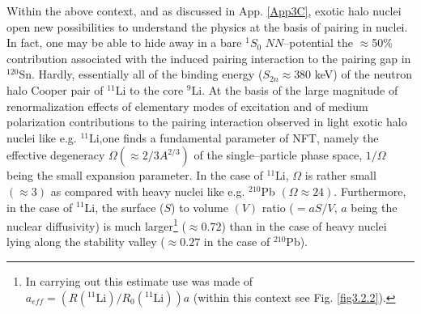 \begin{subappendices}
 
 Within the above context, and as discussed in App. \ref{App3C}, exotic halo nuclei open new possibilities to understand the physics at the basis of pairing in nuclei. In fact, one may be able to hide away in a bare $^1S_0$ $NN$--potential the $\approx$50\% contribution associated with the induced pairing interaction to the pairing gap in $^{120}$Sn. Hardly, essentially all of the binding energy ($S_{2n}\approx380$ keV) of the neutron halo Cooper pair of $^{11}$Li to the core $^{9}$Li. At the basis of the large magnitude of renormalization effects of elementary modes of excitation and of medium polarization contributions to the pairing interaction observed in light exotic halo nuclei like e.g. $^{11}$Li,one finds a fundamental parameter of NFT, namely the effective degeneracy $\Omega(\approx2/3A^{2/3})$ of the single--particle phase space, $1/\Omega$ being the small expansion parameter. In the case of $^{11}$Li, $\Omega$ is rather small $(\approx3)$ as compared with heavy nuclei like e.g. $^{210}$Pb $(\Omega\approx24)$. Furthermore, in the case of $^{11}$Li, the surface ($S$) to volume $(V)$ ratio ($=aS/V$, $a$ being the nuclear diffusivity) is much larger\footnote{In carrying out this estimate use was made of $a_{eff}=\left(R(^{11}\text{Li})/R_0(^{11}\text{Li})\right)a$ (within this context see Fig. \ref{fig3.2.2}).} ($\approx0.72$) than in the case of heavy nuclei lying along the stability valley ($\approx0.27$ in the case of $^{210}$Pb).

\end{subappendices}
